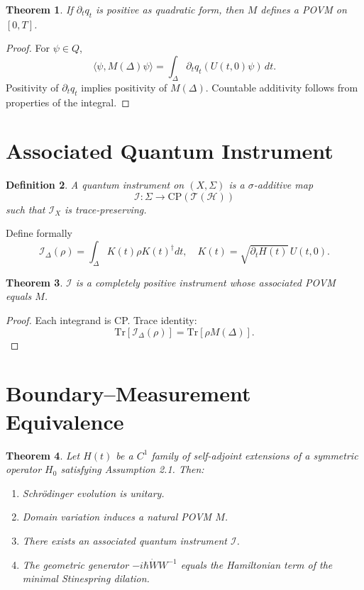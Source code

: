 \documentclass[11pt,a4paper]{article}
\newtheorem{theorem}{Theorem}[section]
\newtheorem{definition}[theorem]{Definition}
\begin{document}
\begin{theorem}
If $\partial_t q_t$ is positive as quadratic form, then
$M$ defines a POVM on $[0,T]$.
\end{theorem}

\begin{proof}
For $\psi\in Q$,
\[
\langle \psi, M(\Delta)\psi\rangle
=
\int_\Delta
\partial_t q_t(U(t,0)\psi)\, dt.
\]
Positivity of $\partial_t q_t$ implies positivity of $M(\Delta)$.
Countable additivity follows from properties of the integral.
\end{proof}

\section{Associated Quantum Instrument}

\begin{definition}
A quantum instrument on $(X,\Sigma)$ is a $\sigma$-additive map
\[
\mathcal I:\Sigma\to \mathrm{CP}(\mathcal T(\mathcal H))
\]
such that $\mathcal I_X$ is trace-preserving.
\end{definition}

Define formally
\[
\mathcal I_\Delta(\rho)
=
\int_\Delta
K(t)\rho K(t)^\dagger dt,
\quad
K(t)=\sqrt{\partial_t H(t)}\, U(t,0).
\]

\begin{theorem}
$\mathcal I$ is a completely positive instrument whose
associated POVM equals $M$.
\end{theorem}

\begin{proof}
Each integrand is CP.
Trace identity:
\[
\mathrm{Tr}[\mathcal I_\Delta(\rho)]
=
\mathrm{Tr}[\rho M(\Delta)].
\]
\end{proof}

\section{Boundary--Measurement Equivalence}

\begin{theorem}
Let $H(t)$ be a $C^1$ family of self-adjoint extensions of a symmetric
operator $H_0$ satisfying Assumption 2.1.
Then:
\begin{enumerate}
\item Schr\"odinger evolution is unitary.
\item Domain variation induces a natural POVM $M$.
\item There exists an associated quantum instrument $\mathcal I$.
\item The geometric generator $-i\hbar \dot W W^{-1}$ equals
the Hamiltonian term of the minimal Stinespring dilation.
\end{enumerate}
\end{theorem}
\end{document}
